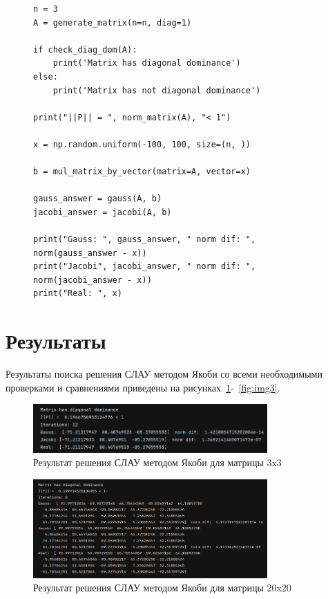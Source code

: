 \documentclass[a4paper, 14pt]{extarticle}
\begin{document}
\begin{figure}[H]
\begin{lstlisting}[language={},caption={Получение результатов и сравнение},label={lst:code3}]
n = 3
A = generate_matrix(n=n, diag=1)

if check_diag_dom(A):
    print('Matrix has diagonal dominance')
else:
    print('Matrix has not diagonal dominance')

print("||P|| = ", norm_matrix(A), "< 1")

x = np.random.uniform(-100, 100, size=(n, ))

b = mul_matrix_by_vector(matrix=A, vector=x)

gauss_answer = gauss(A, b)
jacobi_answer = jacobi(A, b)

print("Gauss: ", gauss_answer, " norm dif: ", norm(gauss_answer - x))
print("Jacobi", jacobi_answer, " norm dif: ", norm(jacobi_answer - x))
print("Real: ", x)
\end{lstlisting}
\end{figure}


\section{Результаты}

Результаты поиска решения СЛАУ методом Якоби со всеми необходимыми проверками и сравнениями приведены на рисунках~\ref{fig:img1}-~\ref{fig:img3}.


\begin{figure}[H]
\centering
\includegraphics[width=0.8\textwidth]{images/res1.png}
\caption{Результат решения СЛАУ методом Якоби для матрицы 3x3}
\label{fig:img1}
\end{figure}


\begin{figure}[H]
\centering
\includegraphics[width=0.8\textwidth]{images/res2.png}
\caption{Результат решения СЛАУ методом Якоби для матрицы 20x20}
\label{fig:img2}
\end{figure}
\end{document}
